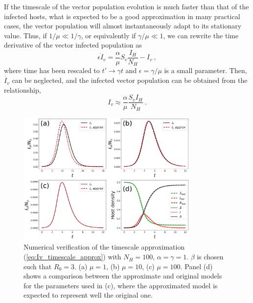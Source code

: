 If the timescale of the vector population evolution is much faster than
that of the infected hosts, what is expected to be a good approximation in many
practical cases, the vector population will almost instantaneously adapt to its
stationary value. Thus, if $1/\mu\ll1/\gamma$, or equivalently if
$\gamma/\mu\ll1$, we can rewrite the time derivative of the vector infected
population as
\begin{equation}
    \epsilon\dot{I}_v=\frac{\alpha}{\mu}S_v\frac{I_H}{N_H} - I_v \ ,
\end{equation}
where time has been rescaled to $t'\to\gamma t$ and $\epsilon=\gamma/\mu$
is a small parameter. Then, $\dot{I_v}$ can be neglected, and the infected
vector population can be obtained from the relationship,
\begin{equation}\label{eq:Iv_timescale_approx}
    I_v\approx\frac{\alpha}{\mu}\frac{S_v I_H}{N_H} \ .
\end{equation}

\begin{figure}[H]
    \centering
    \includegraphics[width=0.8\textwidth]{Figures/Timescale_approx.pdf}
    \caption[Numerical verification of the timescale approximation]{Numerical
        verification of the timescale approximation
        (\cref{eq:Iv_timescale_approx}) with $N_H=100$, $\alpha=\gamma=1$.
        $\beta$ is chosen such that $R_0=3$. (a) $\mu=1$, (b) $\mu=10$, (c)
        $\mu=100$. Panel (d) shows a comparison between the approximate and
        original models for the parameters used in (c), where the approximated
        model is expected to represent well the original one.}
    \label{fig:timescale_approx}
\end{figure}

